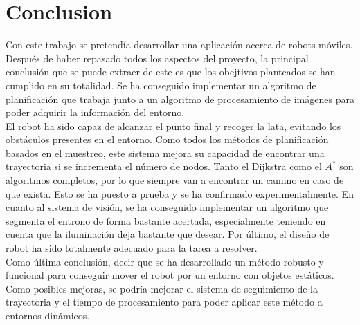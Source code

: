 \chapter{Conclusion}
\label{conclusion}

Con este trabajo se pretendía desarrollar una aplicación acerca de robots móviles. Después de haber repasado todos los aspectos del proyecto, la principal conclusión que se puede extraer de este es que los obejtivos planteados se han cumplido en su totalidad. Se ha conseguido implementar un algoritmo de planificación que trabaja junto a un algoritmo de procesamiento de imágenes para poder adquirir la información del entorno.\\

El robot ha sido capaz de alcanzar el punto final y recoger la lata, evitando los obstáculos presentes en el entorno. Como todos los métodos de planificación basados en el muestreo, este sistema mejora su capacidad de encontrar una trayectoria si se incrementa el número de nodos. Tanto el Dijkstra como el $A^*$ son algoritmos completos, por lo que siempre van a encontrar un camino en caso de que exista. Esto se ha puesto a prueba y se ha confirmado experimentalmente. En cuanto al sistema de visión, se ha conseguido implementar un algoritmo que segmenta el entrono de forma bastante acertada, especialmente teniendo en cuenta que la iluminación deja bastante que desear. Por último, el diseño de robot ha sido totalmente adecuado para la tarea a resolver.\\

Como última conclusión, decir que se ha desarrollado un método robusto y funcional para conseguir mover el robot por un entorno con objetos estáticos. Como posibles mejoras, se podría mejorar el sistema de seguimiento de la trayectoria y el tiempo de procesamiento para poder aplicar este método a entornos dinámicos.\\
